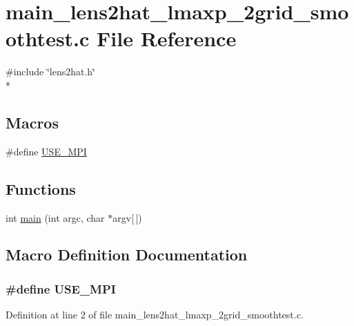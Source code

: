 \section{main\-\_\-lens2hat\-\_\-lmaxp\-\_\-2grid\-\_\-smoothtest.\-c File Reference}
\label{main__lens2hat__lmaxp__2grid__smoothtest_8c}
{\ttfamily \#include \char`\"{}lens2hat.\-h\char`\"{}}\\*
\subsection*{Macros}
\begin{DoxyCompactItemize}
\item 
\#define \hyperlink{main__lens2hat__lmaxp__2grid__smoothtest_8c_a3869d282031f6ea6b50fdb980b758420}{U\-S\-E\-\_\-\-M\-P\-I}
\end{DoxyCompactItemize}
\subsection*{Functions}
\begin{DoxyCompactItemize}
\item 
int \hyperlink{main__lens2hat__lmaxp__2grid__smoothtest_8c_a0ddf1224851353fc92bfbff6f499fa97}{main} (int argc, char $\ast$argv\mbox{[}$\,$\mbox{]})
\end{DoxyCompactItemize}


\subsection{Macro Definition Documentation}
\subsubsection[{U\-S\-E\-\_\-\-M\-P\-I}]{\setlength{\rightskip}{0pt plus 5cm}\#define U\-S\-E\-\_\-\-M\-P\-I}\label{main__lens2hat__lmaxp__2grid__smoothtest_8c_a3869d282031f6ea6b50fdb980b758420}


Definition at line 2 of file main\-\_\-lens2hat\-\_\-lmaxp\-\_\-2grid\-\_\-smoothtest.\-c.



